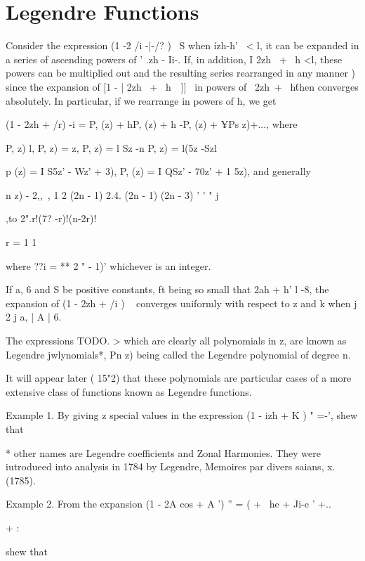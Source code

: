 \chapter{Legendre Functions} 


Consider the expression (1 -2 /i -|-/? )~ S when \'izh-h' \ < l, it
can be expanded in a series of ascending powers of ' .zh - Ii-. If, in
addition, I 2zh \ + \ h <l, these powers can be multiplied out and the
resulting series rearranged in any manner ) since the expansion
of [1 - | 2zh \ + \ h\ \ ]]~ in powers of \ 2zh\ + \ h\' then
converges absolutely. In particular, if we rearrange in powers of h,
we get

(1 - 2zh + /r) -i = P, (z) + hP, (z) + h -P, (z) + ¥Ps z)+..., where

P, z) l, P, z) = z, P, z) = l Sz -n P, z) = l(5z -Szl

p (z) = I S5z' - Wz' + 3), P, (z) = I QSz' - 70z' + 1 5z), and
generally

 n z) - 2,, \,, 1 2 (2n - 1) 2.4. (2n - 1) (2n - 3) ' ' " j

,to 2".r!(7? -r)!(n-2r)!

r = 1 1

where ??i = ** 2 " - 1)' whichever is an integer.

If a, 6 and S be positive constants, ft being so small that 2ah + h' l
-8, the expansion of (1 - 2zh + /i ) ~ converges uniformly with
respect to z and k when j 2 j a, | A | 6.

The expressions TODO.    > which are clearly all
polynomials in z, are known as Legendre jwlynomials*, Pn z) being
called the Legendre polynomial of degree n.

It will appear later ( 15"2) that these polynomials are particular
cases of a more extensive class of functions known as Legendre
functions.

Example 1. By giving z special values in the expression (1 - izh + K )
" =-', shew that

* other names are Legendre coefficients and Zonal Harmonies. They were
iutrodueed into analysis in 1784 by Legendre, Memoires par divers
saians, x. (1785).

%
%

Example 2. From the expansion (1 - 2A cos + A ') '' = ( + \ he + Ji-e
' +..\

+ :

shew that

